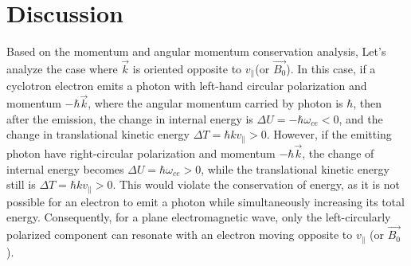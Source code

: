 \documentclass{cpbtex3}
\begin{document}
\section{Discussion }\label{sec:Discussion}
Based on the momentum and angular momentum conservation analysis, Let's analyze the case where $\vec{k}$ is oriented opposite to $v_{\parallel}$(or $\vec{B_0}$). In this case, if a cyclotron electron emits a photon with left-hand circular polarization and momentum $-\hbar\vec{k}$, where the angular momentum carried by photon is $\hbar$, then after the emission, the change in internal energy is $\Delta U = -\hbar\omega_{ce}<0$, and the change in translational kinetic energy $\Delta T = \hbar k v_{\parallel}>0$. However, if the emitting photon have right-circular polarization and momentum $-\hbar\vec{k}$, the change of internal energy becomes $\Delta U = \hbar\omega_{ce}>0$, while the translational kinetic energy still is $\Delta T = \hbar k v_{\parallel}>0$. This would violate the conservation of energy, as it is not possible for an electron to emit a photon while simultaneously increasing its total energy. Consequently, for a plane electromagnetic wave, only the left-circularly polarized component can resonate with an electron moving opposite to $v_{\parallel}$ (or $\vec{B_0}$). 
%
%
\end{document}
